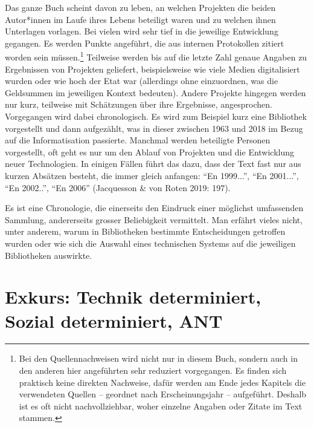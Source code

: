 \documentclass[a4paper,
fontsize=11pt,
oneside,
numbers=noperiodatend,
parskip=half-,
bibliography=totoc,
final
]{scrartcl}
\begin{document}
Das ganze Buch scheint davon zu leben, an welchen Projekten die beiden
Autor*innen im Laufe ihres Lebens beteiligt waren und zu welchen ihnen
Unterlagen vorlagen. Bei vielen wird sehr tief in die jeweilige
Entwicklung gegangen. Es werden Punkte angeführt, die aus internen
Protokollen zitiert worden sein müssen.\footnote{Bei den
  Quellennachweisen wird nicht nur in diesem Buch, sondern auch in den
  anderen hier angeführten sehr reduziert vorgegangen. Es finden sich
  praktisch keine direkten Nachweise, dafür werden am Ende jedes
  Kapitels die verwendeten Quellen -- geordnet nach Erscheinungsjahr --
  aufgeführt. Deshalb ist es oft nicht nachvollziehbar, woher einzelne
  Angaben oder Zitate im Text stammen.} Teilweise werden bis auf die
letzte Zahl genaue Angaben zu Ergebnissen von Projekten geliefert,
beispielsweise wie viele Medien digitalisiert wurden oder wie hoch der
Etat war (allerdings ohne einzuordnen, was die Geldsummen im jeweiligen
Kontext bedeuten). Andere Projekte hingegen werden nur kurz, teilweise
mit Schätzungen über ihre Ergebnisse, angesprochen. Vorgegangen wird
dabei chronologisch. Es wird zum Beispiel kurz eine Bibliothek
vorgestellt und dann aufgezählt, was in dieser zwischen 1963 und 2018 im
Bezug auf die Informatisation passierte. Manchmal werden beteiligte
Personen vorgestellt, oft geht es nur um den Ablauf von Projekten und
die Entwicklung neuer Technologien. In einigen Fällen führt das dazu,
dass der Text fast nur aus kurzen Absätzen besteht, die immer gleich
anfangen: \enquote{En 1999...}, \enquote{En 2001...}, \enquote{En
2002..}, \enquote{En 2006} (Jacquesson \& von Roten 2019: 197).

Es ist eine Chronologie, die einerseits den Eindruck einer möglichst
umfassenden Sammlung, andererseits grosser Beliebigkeit vermittelt. Man
erfährt vieles nicht, unter anderem, warum in Bibliotheken bestimmte
Entscheidungen getroffen wurden oder wie sich die Auswahl eines
technischen Systems auf die jeweiligen Bibliotheken auswirkte.

\hypertarget{exkurs-technik-determiniert-sozial-determiniert-ant}{%
\section{Exkurs: Technik determiniert, Sozial determiniert,
ANT}\label{exkurs-technik-determiniert-sozial-determiniert-ant}}
\end{document}
